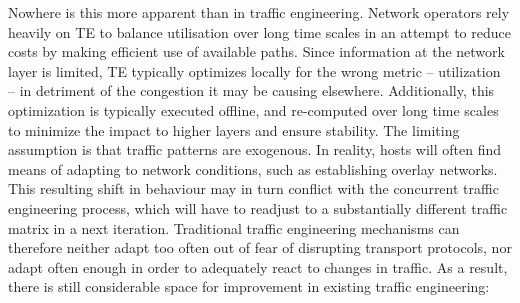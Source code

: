 Nowhere is this more apparent than in traffic engineering. 
Network operators rely heavily on \ac{TE} to balance utilisation over long time scales in an attempt to reduce costs by making efficient use of available paths. 
Since information at the network layer is limited, \ac{TE} typically optimizes locally for the wrong metric -- utilization -- in detriment of the congestion it may be causing elsewhere. 
Additionally, this optimization is typically executed offline, and re-computed over long time scales to minimize the impact to higher layers and ensure stability. 
The limiting assumption is that traffic patterns are exogenous. 
In reality, hosts will often find means of adapting to network conditions, such as establishing overlay networks. 
This resulting shift in behaviour may in turn conflict with the concurrent traffic engineering process, which will have to readjust to a substantially different traffic matrix in a next iteration. 
Traditional traffic engineering mechanisms can therefore neither adapt too often out of fear of disrupting transport protocols, nor adapt often enough in order to adequately react to changes in traffic.
As a result, there is still considerable space for improvement in existing traffic engineering:

